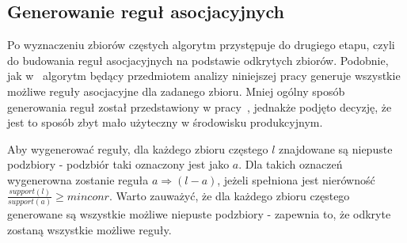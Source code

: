 \subsection{Generowanie reguł asocjacyjnych}

Po wyznaczeniu zbiorów częstych algorytm przystępuje do drugiego etapu, czyli do budowania reguł asocjacyjnych na podstawie odkrytych zbiorów. Podobnie, jak w~\cite{Apriori:Main} algorytm będący przedmiotem analizy niniejszej pracy generuje wszystkie możliwe reguły asocjacyjne dla zadanego zbioru. Mniej ogólny sposób generowania reguł został przedstawiony w pracy~\cite{Problem:Statement}, jednakże podjęto decyzję, że jest to sposób zbyt mało użyteczny w środowisku produkcyjnym.

Aby wygenerować reguły, dla każdego zbioru częstego $l$ znajdowane są niepuste podzbiory - podzbiór taki oznaczony jest jako $a$. Dla takich oznaczeń wygenerowna zostanie reguła $a \Rightarrow (l-a)$, jeżeli spełniona jest nierówność $\frac{support(l)}{support(a)} \geq minconr$. Warto zauważyć, że dla każdego zbioru częstego generowane są wszystkie możliwe niepuste podzbiory - zapewnia to, że odkryte zostaną wszystkie możliwe reguły.



 




